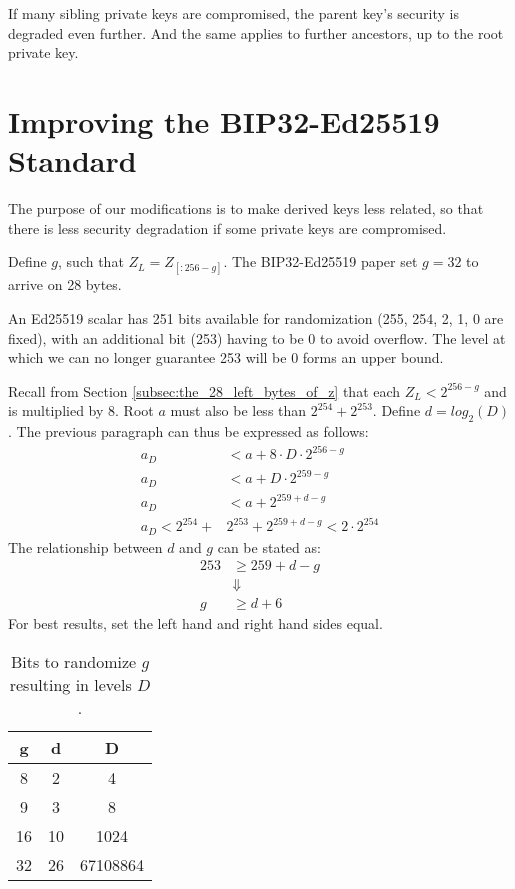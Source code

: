 \documentclass[12pt, a4paper, twocolumn]{article}
\begin{document}
If many sibling private keys are compromised, the parent key's security is degraded even further. And the same applies to further ancestors, up to the root private key.

\section{Improving the BIP32-Ed25519 Standard}

The purpose of our modifications is to make derived keys less related, so that there is less security degradation if some private keys are compromised.

Define $g$, such that $Z_L = Z_{[:256-g]}$. The BIP32-Ed25519 paper\cite{BIP32-Ed25519} set $g=32$ to arrive on 28 bytes.

An Ed25519 scalar has 251 bits available for randomization (255, 254, 2, 1, 0 are fixed), with an additional bit (253) having to be 0 to avoid overflow. The level at which we can no longer guarantee 253 will be 0 forms an upper bound.

Recall from Section \ref{subsec:the_28_left_bytes_of_z} that each $Z_L < 2^{256 - g}$ and is multiplied by 8. Root $a$ must also be less than $2^{254} + 2^{253}$. Define $d = log_2(D)$. The previous paragraph can thus be expressed as follows:
\begin{align*}
  a_D &< a + 8\cdot D\cdot2^{256 - g} \\
  a_D &< a + D\cdot2^{259 - g} \\
  a_D &< a + 2^{259 + d - g}\\
  a_D < 2^{254} +& 2^{253} + 2^{259 + d - g} < 2 \cdot 2^{254}
\end{align*}
The relationship between $d$ and $g$ can be stated as:
\begin{align*}
  253 &\geq 259 + d - g \\
  &\Downarrow \\
  g &\geq d + 6
\end{align*}
For best results, set the left hand and right hand sides equal.

\begin{table}[h]
  \centering
  \begin{tabular}{|c|c|c|}
  \hline
  g & d  & D  \\
  \hline
  8 & 2 & 4 \\
  9 & 3 & 8 \\
  16 & 10 & 1024 \\
  32 & 26 & 67108864 \\
  \hline
  \end{tabular}
  \caption{Bits to randomize $g$ resulting in levels $D$.}
  \label{tab:g_and_d}
  \end{table}
\end{document}

